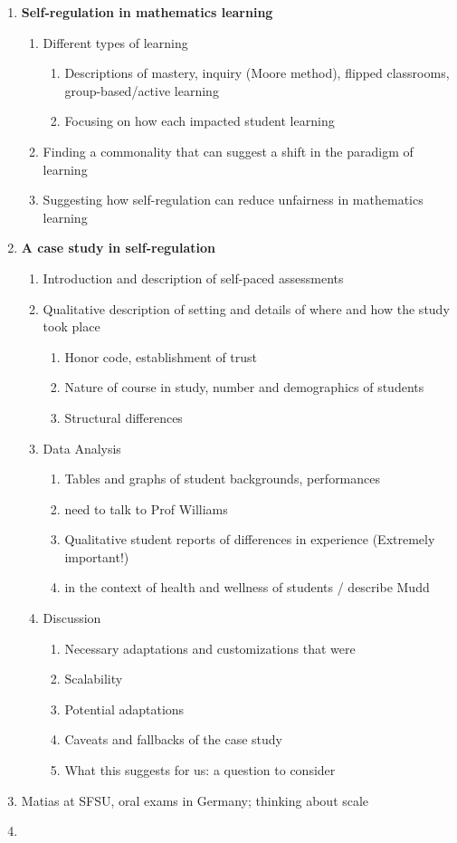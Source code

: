 \begin{enumerate}
    \item{\bf Self-regulation in mathematics learning}
    \begin{enumerate}
      \item Different types of learning
      \begin{enumerate}
        \item Descriptions of mastery, inquiry (Moore method), flipped classrooms, group-based/active learning
        \item Focusing on how each impacted student learning
      \end{enumerate}
      \item Finding a commonality that can suggest a shift in the paradigm of learning
      \item Suggesting how self-regulation can reduce unfairness in mathematics learning
    \end{enumerate}
    \item {\bf A case study in self-regulation}
    \begin{enumerate}
      \item Introduction and description of self-paced assessments
      \item Qualitative description of setting and details of where and how the study took place
      \begin{enumerate}
        \item Honor code, establishment of trust
        \item Nature of course in study, number and demographics of students
        \item Structural differences
      \end{enumerate}
      \item Data Analysis
      \begin{enumerate}
        \item Tables and graphs of student backgrounds, performances
        \item need to talk to Prof Williams
        \item Qualitative student reports of differences in experience (Extremely important!)
        \item in the context of health and wellness of students / describe Mudd
      \end{enumerate}
      \item Discussion
      \begin{enumerate}
        \item Necessary adaptations and customizations that were
        \item Scalability
        \item Potential adaptations
        \item Caveats and fallbacks of the case study
        \item What this suggests for us: a question to consider
      \end{enumerate}
    \end{enumerate}
    \item Matias at SFSU, oral exams in Germany; thinking about scale
    \item
\end{enumerate}
